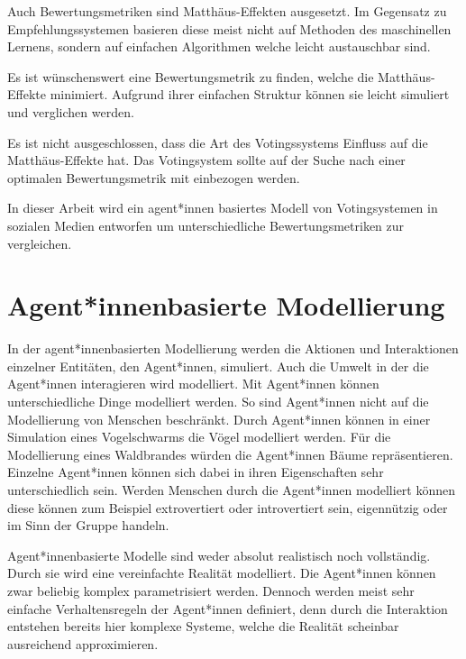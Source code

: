 Auch Bewertungsmetriken sind Matthäus-Effekten ausgesetzt. Im Gegensatz zu Empfehlungssystemen basieren diese meist nicht auf Methoden des maschinellen Lernens, sondern auf einfachen Algorithmen welche leicht austauschbar sind. 

Es ist wünschenswert eine Bewertungsmetrik zu finden, welche die Matthäus-Effekte minimiert. Aufgrund ihrer einfachen Struktur können sie leicht simuliert und verglichen werden.

Es ist nicht ausgeschlossen, dass die Art des Votingssystems Einfluss auf die Matthäus-Effekte hat. Das Votingsystem sollte auf der Suche nach einer optimalen Bewertungsmetrik mit einbezogen werden.

In dieser Arbeit wird ein agent*innen basiertes Modell von Votingsystemen in sozialen Medien entworfen um unterschiedliche Bewertungsmetriken zur vergleichen.





\section{Agent*innenbasierte Modellierung}

In der agent*innenbasierten Modellierung werden die Aktionen und Interaktionen einzelner Entitäten, den Agent*innen, simuliert. Auch die Umwelt in der die Agent*innen interagieren wird modelliert. Mit Agent*innen können unterschiedliche Dinge modelliert werden. So sind Agent*innen nicht auf die Modellierung von Menschen beschränkt. Durch Agent*innen können in einer Simulation eines Vogelschwarms die Vögel modelliert werden. Für die Modellierung eines Waldbrandes würden die Agent*innen Bäume repräsentieren. Einzelne Agent*innen können sich dabei in ihren Eigenschaften sehr unterschiedlich sein. Werden Menschen durch die Agent*innen modelliert können diese können zum Beispiel extrovertiert oder introvertiert sein, eigennützig oder im Sinn der Gruppe handeln.

Agent*innenbasierte Modelle sind weder absolut realistisch noch vollständig. Durch sie wird eine vereinfachte Realität modelliert. Die Agent*innen können zwar beliebig komplex parametrisiert werden. Dennoch werden meist sehr einfache Verhaltensregeln der Agent*innen definiert, denn durch die Interaktion entstehen bereits hier komplexe Systeme, welche die Realität scheinbar ausreichend approximieren.

